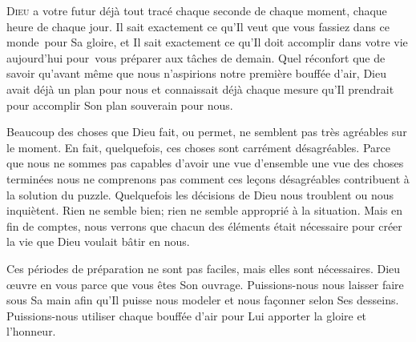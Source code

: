 

\lettrine{D}{ieu} a votre futur déjà tout tracé
 \ocadr chaque seconde de chaque moment, chaque heure de chaque jour.
 Il sait exactement ce qu'Il veut que vous fassiez dans ce monde~pour
 Sa gloire, et Il sait exactement ce qu'Il doit accomplir
 dans votre vie aujourd'hui pour~vous préparer aux tâches de demain.
 Quel réconfort que de savoir qu'avant même que nous n'aspirions
 notre première bouffée d'air, Dieu avait déjà un plan pour nous
 et connaissait déjà chaque mesure qu'Il prendrait pour accomplir
 Son plan souverain pour nous.


Beaucoup des choses que Dieu fait, ou permet, ne semblent pas très agréables
 sur le moment. En fait, quelquefois, ces choses sont carrément
 désagréables. Parce que nous ne sommes pas capables d'avoir une vue
 d'ensemble \ocadr une vue des choses terminées \fcadr{} nous ne comprenons
 pas comment ces leçons désagréables contribuent à la solution du puzzle.
 Quelquefois les décisions de Dieu nous troublent ou nous inquiètent.
 Rien ne semble bien; rien ne semble approprié à la situation.
 Mais en fin de comptes, nous verrons que chacun des éléments
 était nécessaire pour créer la vie que Dieu voulait bâtir en nous.

Ces périodes de préparation ne sont pas faciles,
 mais elles sont nécessaires. Dieu œuvre en vous parce que vous êtes
 Son ouvrage. Puissions-nous nous laisser faire sous Sa main
 afin qu'Il puisse nous modeler et nous façonner selon Ses desseins.
 Puissions-nous utiliser chaque bouffée d'air pour Lui apporter
 la gloire et l'honneur.

\dvrule






